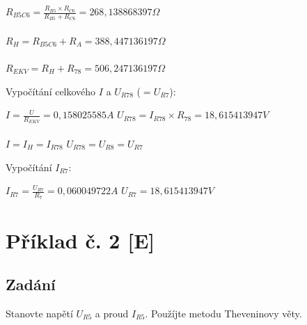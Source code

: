 \documentclass[12pt,a4paper,titlepage,final]{article}
\begin{document}
	\begin{tabbing}
		${ \displaystyle R_{B5C6} = \frac{R_{B5} \times R_{C6}}
		{R_{B5} + R_{C6}} =
		268,138868397 \Omega}$ \\
		\\
		${ \displaystyle R_{H} = R_{B5C6} + R_{A} =
		388,447136197 \Omega}$ \\
		\\
		${ \displaystyle R_{EKV} = R_{H} + R_{78} =
		506,247136197 \Omega}$ \\
	\end{tabbing}
	
	Vypočítání celkového $I$ a $U_{R78}$ ($= U_{R7}$): \\

	\begin{tabbing}
		${ \displaystyle I = \frac{U}{R_{EKV}} = 0,158025585 A}$ \qquad
		\qquad
		${ \displaystyle U_{R78} = I_{R78} \times R_{78} = 18,615413947 V}$ \\
		\\
		${ \displaystyle I = I_{H} = I_{R78} }$ \qquad
		\qquad \qquad \qquad \qquad
		${ \displaystyle U_{R78} = U_{R8} = U_{R7} }$ \\
	\end{tabbing}
	
	Vypočítání  $I_{R7}$: \\

	\begin{tabbing}
		${ \displaystyle I_{R7} = \frac{U_{R7}}{R_{7}} =  0,060049722 A}$ \qquad
		\qquad
		${ \displaystyle U_{R7} = 18,615413947 V}$	
	\end{tabbing}

	\newpage
	

	\section*{Příklad č. 2 [E]} \label{pr2}


	\subsection*{Zadání}

	Stanovte napětí $U_{R5}$ a proud $I_{R5}$. Použíjte metodu Theveninovy věty.
	\\
\end{document}
